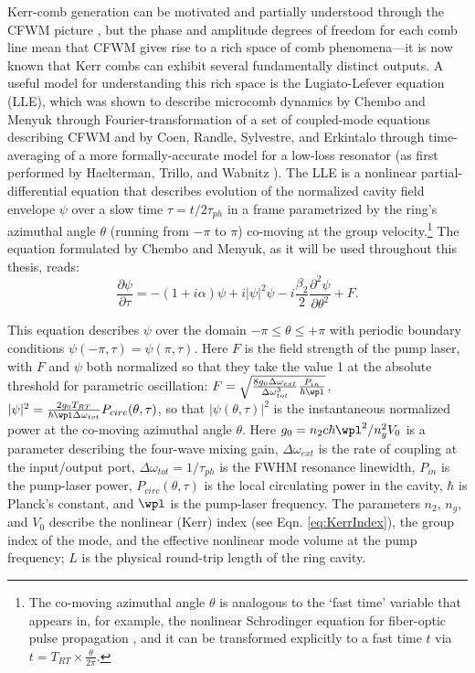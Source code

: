 Kerr-comb generation can be motivated and partially understood through the CFWM picture \cite{Herr2012}, but the phase and amplitude degrees of freedom for each comb line mean that CFWM gives rise to a rich space of comb phenomena---it is now known that Kerr combs can exhibit several fundamentally distinct outputs.  A useful model for understanding this rich space is the Lugiato-Lefever equation (LLE), which was shown to describe microcomb dynamics by Chembo and Menyuk \cite{Chembo2013} through Fourier-transformation of a set of coupled-mode equations describing CFWM and by Coen, Randle, Sylvestre, and Erkintalo \cite{Coen2013a} through time-averaging of a more formally-accurate model for a low-loss resonator (as first performed by Haelterman, Trillo, and Wabnitz \cite{Haelterman1992a}).  The LLE is a nonlinear partial-differential equation that describes evolution of the normalized cavity field envelope $\psi$ over a slow time $\tau=t/2\tau_{ph}$ in a frame parametrized by the ring's azimuthal angle $\theta$ (running from $-\pi$ to $\pi$) co-moving at the group velocity.\footnote{The co-moving azimuthal angle $\theta$ is analogous to the `fast time' variable that appears in, for example, the nonlinear Schrodinger equation for fiber-optic pulse propagation \cite{Agrawal2007}, and it can be transformed explicitly to a fast time $t$ via $t=T_{RT}\times\frac{\theta}{2\pi}$.} The equation formulated by Chembo and Menyuk, as it will be used throughout this thesis, reads:
\begin{equation}
\frac{\partial \psi}{\partial \tau}=-(1+i \alpha) \psi + i|\psi|^2 \psi -i \frac{\beta_2}{2} \frac{\partial^2 \psi}{\partial \theta^2} +F. \label{eq:LLE}
\end{equation}

This equation describes $\psi$ over the domain $-\pi\leq\theta\leq+\pi$ with periodic boundary conditions $\psi(-\pi,\tau)=\psi(\pi,\tau)$. Here $F$ is the field strength of the pump laser, with $F$ and $\psi$ both normalized so that they  take the value 1 at the absolute threshold for parametric oscillation: $F=\sqrt{\frac{8 g_0\Delta\omega_{ext}}{\Delta\omega_{tot}^3}\frac{P_{in}}{\hbar \wpl}}$, $|\psi|^2=\frac{2g_0T_{RT}}{\hbar\wpl\Delta\omega_{tot}}P_{circ}(\theta,\tau)$, so that $|\psi(\theta,\tau)|^2$ is the instantaneous normalized power at the co-moving azimuthal angle $\theta$. Here $g_0=n_2 c \hbar \wpl^2/n_g^2 V_0$ is a parameter describing the four-wave mixing gain, $\Delta\omega_{ext}$ is the rate of coupling at the input/output port, $\Delta\omega_{tot}=1/\tau_{ph}$ is the FWHM resonance linewidth, $P_{in}$ is the pump-laser power, $P_{circ}(\theta,\tau)$ is the local circulating power in the cavity, $\hbar$ is Planck's constant, and $\wpl$ is the pump-laser frequency. The parameters $n_2$, $n_g$, and $V_0$ describe the nonlinear (Kerr) index (see Eqn. \ref{eq:KerrIndex}), the group index of the mode, and the effective nonlinear mode volume at the pump frequency; $L$ is the physical round-trip length of the ring cavity. 

